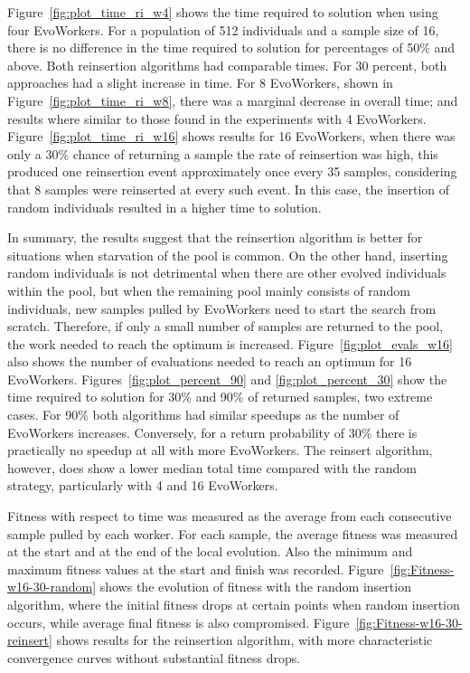 Figure~\ref{fig:plot_time_ri_w4} shows the time required 
to solution when using four EvoWorkers. For a population of
512 individuals and a sample size of 16, there is no
difference in the time required to solution for 
percentages of 50\% and above. Both reinsertion algorithms
had comparable times. For 30 percent, both approaches 
had a slight increase in time. For 8 EvoWorkers, shown in Figure~\ref{fig:plot_time_ri_w8},  there was a marginal
decrease in overall time; and results where similar to those found in the experiments with 4 EvoWorkers.  
Figure~\ref{fig:plot_time_ri_w16} shows results for 16 EvoWorkers,
when there was only a 30\% chance of returning a sample the rate of reinsertion was high, this produced one reinsertion event approximately once every 35 samples,
considering that 8 samples were reinserted at every such event.
In this case, the insertion of random individuals resulted in a higher time to solution.

In summary, the results suggest that the reinsertion algorithm is better
for situations when starvation of the pool is common.
On the other hand, inserting random individuals is not detrimental when there
are other evolved individuals within the pool, but when the remaining
pool mainly consists of random individuals, new samples pulled by EvoWorkers need to start the search from scratch. 
Therefore, if only a small number of samples are returned to the pool, the work needed to reach the
optimum is increased. Figure~\ref{fig:plot_evals_w16} also shows the number 
of evaluations needed to reach an optimum for 16 EvoWorkers.
Figures~\ref{fig:plot_percent_90} and \ref{fig:plot_percent_30} show
the time required to solution for 30\% and 90\% of returned samples, two extreme cases.
For 90\% both algorithms had similar speedups as the number of EvoWorkers increases.
Conversely, for a return probability of 30\% there is practically no speedup at all with more EvoWorkers.
The reinsert algorithm, however, does show a lower median total time compared with the random strategy, particularly with 4 and 16 EvoWorkers.         

Fitness with respect to time was measured as the average from each consecutive
sample pulled by each worker. For each sample, the average fitness
was measured at the start and at the end of the local evolution.
Also the minimum and maximum fitness values at the start and finish was recorded.    
Figure~\ref{fig:Fitness-w16-30-random} shows the evolution of fitness
with the random insertion algorithm, where the initial fitness drops
at certain points when random insertion occurs, while average final fitness 
is also compromised. Figure~\ref{fig:Fitness-w16-30-reinsert}
shows results for the reinsertion algorithm, with more
characteristic convergence curves without substantial fitness drops. 





